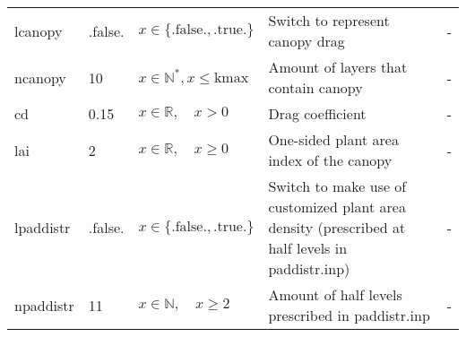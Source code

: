 \documentclass[twoside,11pt,fleqn,a4paper,english,openright]{report}
\begin{document}
\begin{center}
  \tablelasttail{
        &&&&\\\hline
  }
\begin{supertabular}{|l|p{1.5cm}|p{3.5cm}|p{6cm}|l|}
  lcanopy	& .false.	& $x\in\{\text{.false.},\text{.true.}\}$		& Switch to represent canopy drag	& -\\
  ncanopy	& 10		& $x \in \mathbb{N}^*, x \leq \text{kmax}$		& Amount of layers that contain canopy	& -\\
  cd		& 0.15		& $x \in \mathbb{R}, \quad x > 0$				& Drag coefficient	& -\\
  lai		& 2			& $x \in \mathbb{R}, \quad x\geq 0$				& One-sided plant area index of the canopy	& -\\
  lpaddistr	& .false.	& $x\in\{\text{.false.},\text{.true.}\}$		& Switch to make use of customized plant area density (prescribed at half levels in paddistr.inp)	& -\\
  npaddistr & 11		& $x \in \mathbb{N}, \quad x \geq 2$			& Amount of half levels prescribed in paddistr.inp	& -\\

\end{supertabular}
\end{center}
\end{document}
